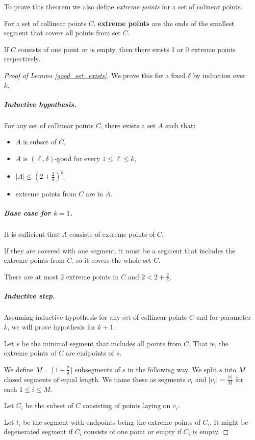 To prove this theorem we also define \textit{extreme points}
for a set of colinear points.

\begin{defi}
	For a set of collinear points $C$,
	\textbf{extreme points} are the ends
	of the smallest segment that covers all points from set $C$.
	
	If $C$ consists of one point or is empty, then
	there exists 1 or 0 extreme points respectively.
\end{defi}

\begin{proof}[Proof of Lemma \ref{good_set_exists}]
We prove this for a fixed $\delta$ by induction over $k$.

\subparagraph{Inductive hypothesis.}
For any set of collinear points $C$, there exists a set $A$ such that:
\begin{itemize}
\item $A$ is subset of $C$,
\item $A$ is $(\ell, \delta)$-good for every $1 \le \ell \le k$,
\item $|A| \le (2+\frac{2}{\delta})^k$,
\item extreme points from $C$ are in $A$.
\end{itemize}

\subparagraph{Base case for $k = 1$.}
It is sufficient that $A$ consists of extreme points of $C$.

If they are covered with one segment, it must be a segment 
that includes the extreme points from $C$, so it covers the whole set $C$.

There are at most 2 extreme points in $C$ and $2 < 2+\frac{2}{\delta}$.

\subparagraph{Inductive step.}
Assuming inductive hypothesis for any set of collinear points $C$
and for parameter $k$, we will prove hypothesis for $k+1$.

Let $s$ be the minimal segment that includes all points from $C$.
That is, the extreme points of $C$ are endpoints of $s$.

We define $M = \lceil1+\frac{2}{\delta}\rceil$ subsegments of $s$ in the following way.
We split $s$ into $M$ closed segments of equal length.
We name these as segments $v_i$ and
$|v_i| = \frac{|s|}{M}$ for each $1 \le i \le M$.

Let $C_i$ be the subset of $C$ consisting of points laying on $v_i$.

Let $t_i$ be the segment with endpoints being the extreme points of $C_i$.
It might be degenerated segment if $C_i$ consists of one point
or empty if $C_i$ is empty.


\end{proof}
